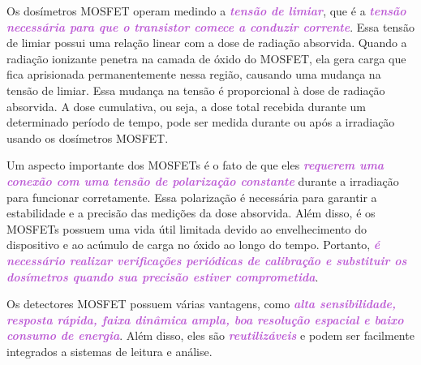 \documentclass[11pt,a4paper]{article}
\begin{document}
	Os dosímetros MOSFET operam medindo a \textcolor{MediumOrchid}{\textit{\textbf{tensão de limiar}}}, que é a \textcolor{MediumOrchid}{\textit{\textbf{tensão necessária para que o transistor comece a conduzir corrente}}}. Essa tensão de limiar possui uma relação linear com a dose de radiação absorvida. Quando a radiação ionizante penetra na camada de óxido do MOSFET, ela gera carga que fica aprisionada permanentemente nessa região, causando uma mudança na tensão de limiar. Essa mudança na tensão é proporcional à dose de radiação absorvida. A dose cumulativa, ou seja, a dose total recebida durante um determinado período de tempo, pode ser medida durante ou após a irradiação usando os dosímetros MOSFET.

	Um aspecto importante dos MOSFETs é o fato de que eles \textcolor{MediumOrchid}{\textit{\textbf{requerem uma conexão com uma tensão de polarização constante}}} durante a irradiação para funcionar corretamente. Essa polarização é necessária para garantir a estabilidade e a precisão das medições da dose absorvida. Além disso, é os MOSFETs possuem uma vida útil limitada devido ao envelhecimento do dispositivo e ao acúmulo de carga no óxido ao longo do tempo. Portanto, \textcolor{MediumOrchid}{\textit{\textbf{é necessário realizar verificações periódicas de calibração e substituir os dosímetros quando sua precisão estiver comprometida}}}.

	Os detectores MOSFET possuem várias vantagens, como \textcolor{MediumOrchid}{\textit{\textbf{alta sensibilidade, resposta rápida, faixa dinâmica ampla, boa resolução espacial e baixo consumo de energia}}}. Além disso, eles são \textcolor{MediumOrchid}{\textit{\textbf{reutilizáveis}}} e podem ser facilmente integrados a sistemas de leitura e análise.
\end{document}
